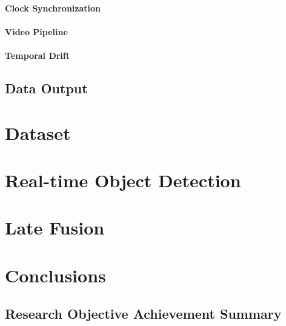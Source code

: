 \documentclass{erauthesis}
\begin{document}
            \subsubsection{Clock Synchronization}
            
            \subsubsection{Video Pipeline}
            
            \subsubsection{Temporal Drift}
            
    \section{Data Output}

\chapter{Dataset}

\chapter{Real-time Object Detection}

\chapter{Late Fusion}

\chapter{Conclusions}


\section{Research Objective Achievement Summary}
\end{document}

